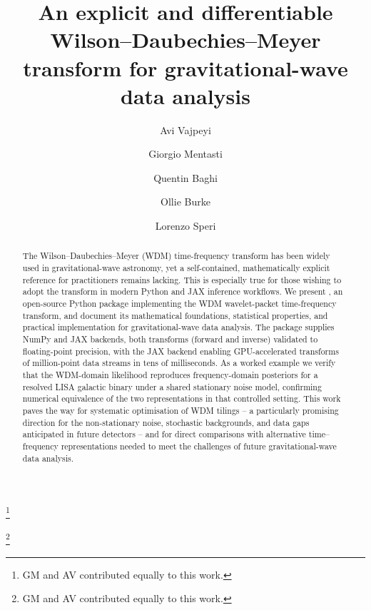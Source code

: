 \documentclass[twocolumn,preprintnumbers,
  superscriptaddress,
  nofootinbib,
  amsmath,
  amssymb,
  aps,
  prd,
  colorlinks=true,
  linkcolor=blue,
  urlcolor=blue,
  citecolor=blue,
  anchorcolor=blue
]{revtex4-2}
\begin{document}

\title{An explicit and differentiable Wilson--Daubechies--Meyer transform for gravitational-wave data analysis}

\author{Avi Vajpeyi }
\thanks{GM and AV contributed equally to this work.}

\author{Giorgio Mentasti }
\thanks{GM and AV contributed equally to this work.}

\author{Quentin Baghi }

\author{Ollie Burke }

\author{Lorenzo Speri }
\begin{abstract}
The Wilson--Daubechies--Meyer (WDM) time-frequency
transform has been widely used in gravitational-wave astronomy, yet a self-contained, mathematically explicit reference for practitioners remains lacking. This is especially true for those wishing to adopt the transform in modern Python and JAX inference workflows.
We present \package, an open-source Python package implementing the WDM wavelet-packet time-frequency transform, and document its mathematical foundations, statistical properties, and practical implementation for gravitational-wave data analysis.
The package supplies NumPy and JAX backends, both transforms (forward and inverse) validated to floating-point precision, with the JAX backend enabling GPU-accelerated transforms of million-point data streams in tens of milliseconds. As a worked example we verify that the WDM-domain likelihood reproduces frequency-domain posteriors for a resolved LISA galactic binary under a shared stationary noise model, confirming numerical equivalence of the two representations in that controlled setting.
This work paves the way for systematic optimisation of WDM tilings -- a particularly promising direction for the non-stationary noise, stochastic backgrounds, and data gaps anticipated in future detectors -- and for direct comparisons with alternative time–frequency representations needed to meet the challenges of future gravitational-wave data analysis.
\end{abstract}
\end{document}
